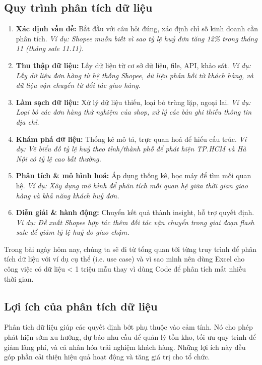 \documentclass[11pt]{article}
\begin{document}
\subsection{Quy trình phân tích dữ liệu}
\begin{enumerate}
	\item \textbf{Xác định vấn đề:} Bắt đầu với câu hỏi đúng, xác định chỉ số kinh doanh cần phân tích.
    \textit{Ví dụ: Shopee muốn biết vì sao tỷ lệ huỷ đơn tăng 12\% trong tháng 11 (tháng sale 11.11).}

    \item \textbf{Thu thập dữ liệu:} Lấy dữ liệu từ cơ sở dữ liệu, file, API, khảo sát.
    \textit{Ví dụ: Lấy dữ liệu đơn hàng từ hệ thống Shopee, dữ liệu phản hồi từ khách hàng, và dữ liệu vận chuyển từ đối tác giao hàng.}

    \item \textbf{Làm sạch dữ liệu:} Xử lý dữ liệu thiếu, loại bỏ trùng lặp, ngoại lai.
    \textit{Ví dụ: Loại bỏ các đơn hàng thử nghiệm của shop, xử lý các bản ghi thiếu thông tin địa chỉ.}

    \item \textbf{Khám phá dữ liệu:} Thống kê mô tả, trực quan hoá để hiểu cấu trúc.
    \textit{Ví dụ: Vẽ biểu đồ tỷ lệ huỷ theo tỉnh/thành phố để phát hiện TP.HCM và Hà Nội có tỷ lệ cao bất thường.}

    \item \textbf{Phân tích \& mô hình hoá:} Áp dụng thống kê, học máy để tìm mối quan hệ.
    \textit{Ví dụ: Xây dựng mô hình để phân tích mối quan hệ giữa thời gian giao hàng và khả năng khách huỷ đơn.}

    \item \textbf{Diễn giải \& hành động:} Chuyển kết quả thành insight, hỗ trợ quyết định.
    \textit{Ví dụ: Đề xuất Shopee hợp tác thêm đối tác vận chuyển trong giai đoạn flash sale để giảm tỷ lệ huỷ do giao chậm.}
\end{enumerate}
Trong bài ngày hôm nay, chúng ta sẽ đi từ tổng quan tới từng truy trình để phân tích dữ liệu với ví dụ cụ thể (i.e. use case) và vì sao mình nên dùng Excel cho công việc có dữ liệu < 1 triệu mẫu thay vì dùng Code để phân tích mất nhiều thời gian.


\subsection{Lợi ích của phân tích dữ liệu}
Phân tích dữ liệu giúp các quyết định bớt phụ thuộc vào cảm tính. Nó cho phép phát hiện sớm xu hướng, dự báo nhu cầu để quản lý tồn kho, tối ưu quy trình để giảm lãng phí, và cá nhân hóa trải nghiệm khách hàng. Những lợi ích này đều góp phần cải thiện hiệu quả hoạt động và tăng giá trị cho tổ chức.
\end{document}
